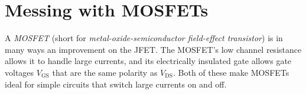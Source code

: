 \section{Messing with MOSFETs}
\label{lab_mosfet}


\bigskip

A \textit{MOSFET} (short for \textit{metal-oxide-semiconductor field-effect transistor}) is in many ways an improvement on the JFET.  The MOSFET's low channel resistance allows it to handle large currents, and its electrically insulated gate allows gate voltages $V_\text{GS}$ that are the same polarity as $V_\text{DS}$.  Both of these make MOSFETs ideal for simple circuits that switch large currents on and off.

